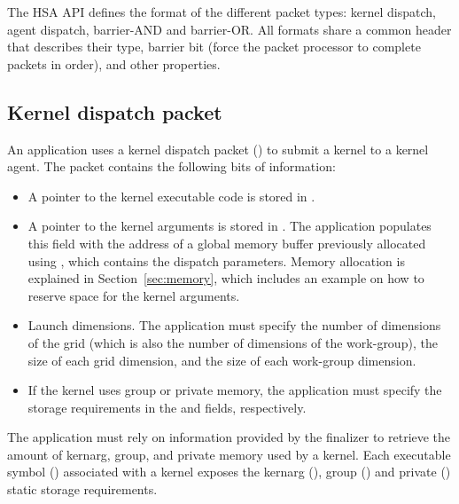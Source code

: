 \documentclass[final,oneside]{book}
\begin{document}
The HSA API defines the format of the different packet types: kernel dispatch,
agent dispatch, barrier-AND and barrier-OR. All formats share a common header
 that describes their type, barrier bit (force the
packet processor to complete packets in order), and other properties.

\subsection{Kernel dispatch packet}\label{dispatch-packet}

An application uses a kernel dispatch packet
() to submit a kernel to a kernel
agent. The packet contains the following bits of information:
\begin{itemize}[itemsep=1pt,topsep=3pt,partopsep=0pt]
\item A pointer to the kernel executable code is stored in
  .
\item A pointer to the kernel arguments is stored in
  . The application
  populates this field with the address of a global memory buffer previously
  allocated using , which contains the dispatch
  parameters. Memory allocation is explained in Section~\ref{sec:memory}, which
  includes an example on how to reserve space for the kernel arguments.
\item Launch dimensions. The application must specify the number of dimensions
  of the grid (which is also the number of dimensions of the work-group), the
  size of each grid dimension, and the size of each work-group dimension.
\item If the kernel uses group or private memory, the application must specify
  the storage requirements in the
   and
   fields,
  respectively.
\end{itemize}

The application must rely on information provided by the finalizer to retrieve
the amount of kernarg, group, and private memory used by a kernel. Each
executable symbol () associated with a kernel
exposes the kernarg
(), group
() and private
() static storage
requirements.
\end{document}

